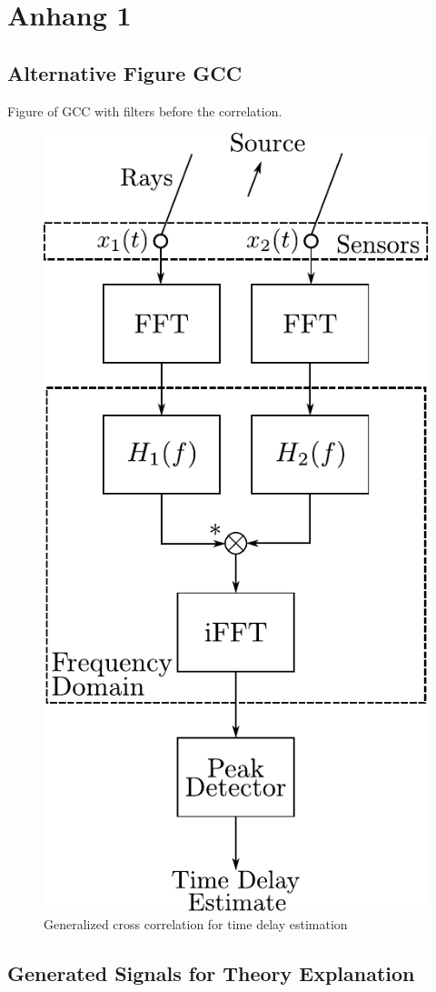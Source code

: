 \chapter{Anhang 1}
\label{chap:appendix1}

\section{Alternative Figure GCC}
\label{appendix:a1_alternativeGcc}

Figure of \ac{GCC} with filters before the correlation.
\begin{figure}[ht]
	\centering
		\includegraphics[width=0.35\columnwidth]{figures/GCC}
	\caption{Generalized cross correlation for time delay estimation}
	\label{fig:ap1_GCC}
\end{figure}

\section{Generated Signals for Theory Explanation}
\label{appendix:a1_signals}


